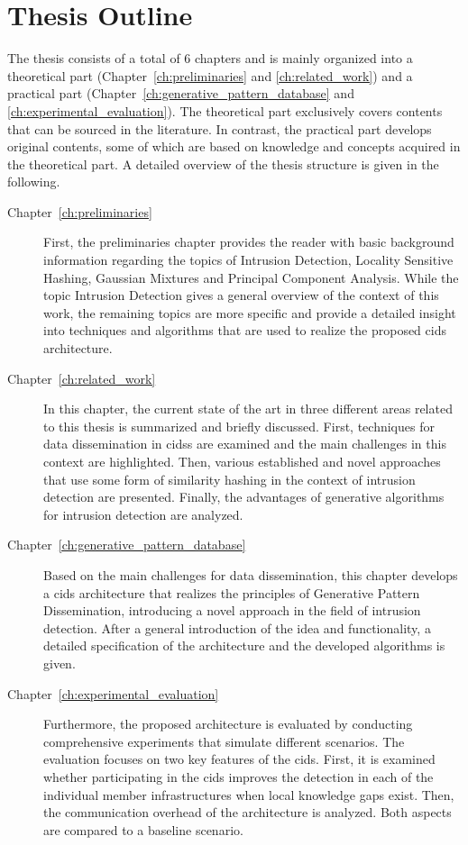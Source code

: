 \documentclass[../../main.tex]{subfiles}
\begin{document}
\newpage
\section{Thesis Outline}

The thesis consists of a total of 6 chapters and is mainly organized into a theoretical part (Chapter~\ref{ch:preliminaries} and \ref{ch:related_work}) and a practical part (Chapter~\ref{ch:generative_pattern_database} and \ref{ch:experimental_evaluation}). The theoretical part exclusively covers contents that can be sourced in the literature. In contrast, the practical part develops original contents, some of which are based on knowledge and concepts acquired in the theoretical part. A detailed overview of the thesis structure is given in the following.

\begin{description}
    \item[Chapter~\ref{ch:preliminaries}] First, the preliminaries chapter provides the reader with basic background information regarding the topics of Intrusion Detection, Locality Sensitive Hashing, Gaussian Mixtures and Principal Component Analysis. While the topic Intrusion Detection gives a general overview of the context of this work, the remaining topics are more specific and provide a detailed insight into techniques and algorithms that are used to realize the proposed \acrshort{cids} architecture.
    \item[Chapter~\ref{ch:related_work}] In this chapter, the current state of the art in three different areas related to this thesis is summarized and briefly discussed. First, techniques for data dissemination in \glspl{cids} are examined and the main challenges in this context are highlighted. Then, various established and novel approaches that use some form of similarity hashing in the context of intrusion detection are presented. Finally, the advantages of generative algorithms for intrusion detection are analyzed.
    \item[Chapter~\ref{ch:generative_pattern_database}] Based on the main challenges for data dissemination, this chapter develops a \gls{cids} architecture that realizes the principles of Generative Pattern Dissemination, introducing a novel approach in the field of intrusion detection. After a general introduction of the idea and functionality, a detailed specification of the architecture and the developed algorithms is given.
    \item[Chapter~\ref{ch:experimental_evaluation}] Furthermore, the proposed architecture is evaluated by conducting comprehensive experiments that simulate different scenarios. The evaluation focuses on two key features of the \gls{cids}. First, it is examined whether participating in the \gls{cids} improves the detection in each of the individual member infrastructures when local knowledge gaps exist. Then, the communication overhead of the architecture is analyzed. Both aspects are compared to a baseline scenario.

\end{description}
\end{document}
